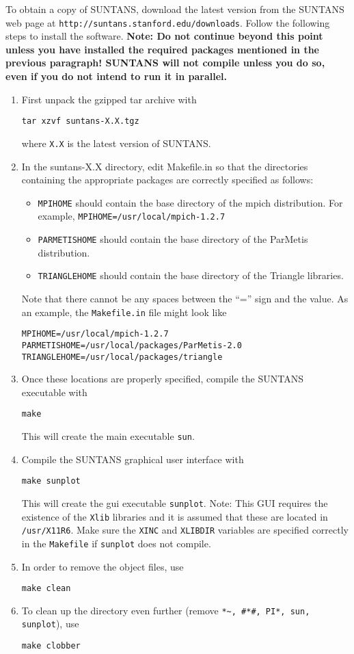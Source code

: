 To obtain a copy of SUNTANS, download the latest version from the SUNTANS
web page at \verb+http://suntans.stanford.edu/downloads+.  Follow the following
steps to install the software.  {\bf Note: Do not continue beyond this point unless
you have installed the required packages mentioned in the previous paragraph!
SUNTANS will not compile unless you do so, even if you do not intend to run it in
parallel.}
\begin{enumerate}
\item First unpack the gzipped tar archive with
\begin{verbatim}
tar xzvf suntans-X.X.tgz
\end{verbatim}
where \verb+X.X+ is the latest version of SUNTANS.  
\item In the suntans-X.X directory, edit Makefile.in so that the directories containing the appropriate packages
are correctly specified as follows:
\begin{itemize}
\item \verb+MPIHOME+ should contain the base directory of the mpich distribution.
For example, 
\verb+MPIHOME=/usr/local/mpich-1.2.7+
\item \verb+PARMETISHOME+ should contain the base directory of the ParMetis distribution.
\item \verb+TRIANGLEHOME+ should contain the base directory of the Triangle libraries.
\end{itemize}
Note that there cannot be any spaces between the ``='' sign and the value.  As an example,
the \verb+Makefile.in+ file might look like
\begin{verbatim}
MPIHOME=/usr/local/mpich-1.2.7
PARMETISHOME=/usr/local/packages/ParMetis-2.0
TRIANGLEHOME=/usr/local/packages/triangle
\end{verbatim}
\item Once these locations are properly specified, compile the SUNTANS executable with
\begin{verbatim}
make
\end{verbatim}
This will create the main executable \verb+sun+.
\item Compile the SUNTANS graphical user interface with
\begin{verbatim}
make sunplot
\end{verbatim}
This will create the gui executable \verb+sunplot+.  Note:  This GUI requires the
existence of the \verb+Xlib+ libraries and it is assumed that these are located
in \verb+/usr/X11R6+.  Make sure the \verb+XINC+ and \verb+XLIBDIR+ variables
are specified correctly in the \verb+Makefile+ if \verb+sunplot+ does not compile.
\item In order to remove the object files, use
\begin{verbatim}
make clean
\end{verbatim}
\item To clean up the directory even further (remove \verb+*~, #*#, PI*, sun, sunplot+),
use
\begin{verbatim}
make clobber
\end{verbatim}
\end{enumerate}

